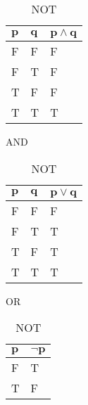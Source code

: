 \begin{table}[h]
    \centering
    \begin{minipage}{.3\linewidth}
        \centering
        \begin{tabular}{|l|l||l|}
            \hline
            $\boldsymbol{p}$ & $\boldsymbol{q}$ & $\boldsymbol{p \land q}$ \\ \hline
            F & F & F \\ \hline
            F & T & F \\ \hline
            T & F & F \\ \hline
            T & T & T \\ \hline
        \end{tabular}
        \caption{AND}
    \end{minipage}
    \begin{minipage}{.3\linewidth}
        \centering
        \begin{tabular}{|l|l||l|}
            \hline
            $\boldsymbol{p}$ & $\boldsymbol{q}$ & $\boldsymbol{p \lor q}$ \\ \hline
            F   & F   & F         \\ \hline
            F   & T   & T         \\ \hline
            T   & F   & T         \\ \hline
            T   & T   & T         \\ \hline
        \end{tabular}
        \caption{OR}
    \end{minipage}
    \begin{minipage}{.3\linewidth}
        \centering
        \begin{tabular}{|l||l|}
            \hline
            $\boldsymbol{p}$ & $\boldsymbol{\lnot p}$ \\ \hline
            F   & T         \\ \hline
            T   & F         \\ \hline
        \end{tabular}
        \caption{NOT}
    \end{minipage}
\end{table}


